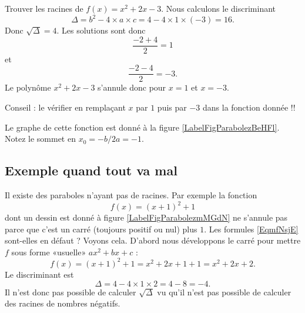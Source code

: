 \begin{example} \label{ExgMRBJJ}
    Trouver les racines de \( f(x)=x^2+2x-3\). Nous calculons le discriminant
    \begin{equation}
        \Delta=b^2-4\times a\times c=4-4\times 1\times (-3)=16.
    \end{equation}
    Donc \( \sqrt{\Delta}=4\). Les solutions sont donc
    \begin{equation}
        \frac{ -2+4 }{ 2 }=1
    \end{equation}
    et
    \begin{equation}
        \frac{ -2-4 }{ 2 }=-3.
    \end{equation}
    Le polynôme \( x^2+2x-3\) s'annule donc pour \( x=1\) et \( x=-3\).

    Conseil : le vérifier en remplaçant \( x\) par \( 1\) puis par \( -3\) dans la fonction donnée !!

    Le graphe de cette fonction est donné à la figure \ref{LabelFigParabolezBeHFl}. Notez le sommet en \( x_0=-b/2a=-1\).
    \newcommand{\CaptionFigParabolezBeHFl}{Graphe de la fonction \( f(x)=x^2+2x-3\) pour l'exemple \ref{ExgMRBJJ}.}

\end{example}

\subsection{Exemple quand tout va mal}

\newcommand{\CaptionFigParabolezmMGdN}{La parabole \( (x+1)^2+1\)}

Il existe des paraboles n'ayant pas de racines. Par exemple la fonction
\begin{equation}
    f(x)=(x+1)^2+1
\end{equation}
dont un dessin est donné à figure \ref{LabelFigParabolezmMGdN} ne s'annule pas parce que c'est un carré (toujours positif ou nul) plus \( 1\). Les formules \eqref{EqmfNsjE} sont-elles en défaut ? Voyons cela. D'abord nous développons le carré pour mettre \( f\) sous forme «usuelle» \( ax^2+bx+c\) :
\begin{equation}
    f(x)=(x+1)^2+1=x^2+2x+1+1=x^2+2x+2.
\end{equation}
Le discriminant est
\begin{equation}
    \Delta=4-4\times 1\times 2=4-8=-4.
\end{equation}
Il n'est donc pas possible de calculer \( \sqrt{\Delta}\) vu qu'il n'est pas possible de calculer des racines de nombres négatifs.

